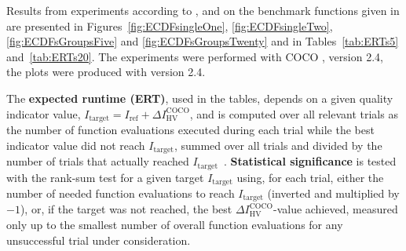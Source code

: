 \documentclass[sigconf]{acmart}
\newcommand{\DI}{\ensuremath{\Delta I_{\mathrm{HV}}^{\mathrm{COCO}}}}
\newcommand{\Itarget}{\ensuremath{I_\mathrm{target}}}
\newcommand{\hvref}{\ensuremath{I_\mathrm{ref}}}
\newcommand{\change}[1]{{\color{red} #1}}
\begin{document}
Results from experiments according to \cite{hansen2016exp},
\cite{hansen2016perfass} and \cite{biobj2016perfass} on the benchmark
functions given in \cite{biobj2016func} are presented in
Figures~\ref{fig:ECDFsingleOne}, \ref{fig:ECDFsingleTwo}, \ref{fig:ECDFsGroupsFive} and
\ref{fig:ECDFsGroupsTwenty} and in Tables~\ref{tab:ERTs5} and~\ref{tab:ERTs20}.
The experiments were performed with COCO \cite{hansen2020cocoplat}, version
\change{2.4}, the plots were produced with version \change{2.4}.

The \textbf{expected runtime (ERT)}, used in the %
tables,
depends on a given quality indicator value, $\Itarget=\hvref+\DI$, and is
computed over all relevant trials as the number of function
evaluations executed during each trial while the best indicator value
did not reach \Itarget, summed over all trials and divided by the
number of trials that actually reached \Itarget\
\cite{hansen2016exp,price1997dev}.  \textbf{Statistical significance}
is tested with the rank-sum test for a given target $\Itarget$
using, for each trial,
either the number of needed function evaluations to reach
$\Itarget$ (inverted and multiplied by $-1$), or, if the target
was not reached, the best $\DI$-value achieved, measured only up to
the smallest number of overall function evaluations for any
unsuccessful trial under consideration.




\end{document}
